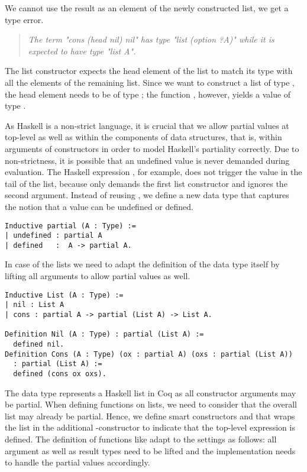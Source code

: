 We cannot use the result as an element of the newly constructed list,
we get a type error.

\begin{quote}
\emph{The term "cons (head nil) nil" has type "list (option ?A)" while it is expected to have type "list A".}
\end{quote}

The list constructor  expects the head element
of the list to match its type with all the elements of the remaining
list.
Since we want to construct a list of type ,
the head element needs to be of type ;
the function , however, yields a value of type
.

As Haskell is a non-strict language, it is crucial that we allow
partial values at top-level as well as within the components of data
structures, that is, within arguments of constructors in order to
model Haskell's partiality correctly.
Due to non-strictness, it is possible that an undefined value is never
demanded during evaluation.
The Haskell expression , for example, does
not trigger the  value in the tail of the list,
because  only demands the first list constructor \hinl{:}
and ignores the second argument.
Instead of reusing , we define a new data type
 that captures the notion that a value can be undefined
or defined.

\begin{verbatim}
Inductive partial (A : Type) :=
| undefined : partial A
| defined   :  A -> partial A.
\end{verbatim}

In case of the lists we need to adapt the definition of the data type
itself by lifting all arguments to allow partial values as well.

\begin{verbatim}
Inductive List (A : Type) :=
| nil : List A
| cons : partial A -> partial (List A) -> List A.

Definition Nil (A : Type) : partial (List A) :=
  defined nil.
Definition Cons (A : Type) (ox : partial A) (oxs : partial (List A)) 
  : partial (List A) :=
  defined (cons ox oxs).
\end{verbatim}

The data type  represents a Haskell list in Coq
as all constructor arguments may be partial.
When defining functions on lists, we need to consider that the overall
list may already be partial.
Hence, we define smart constructors  and
 that wraps the list in the additional
-constructor to indicate that the top-level
expression is defined.
The definition of  functions like  adapt to the settings as
follows: all argument as well as result types need to be lifted and
the implementation needs to handle the partial values accordingly.


